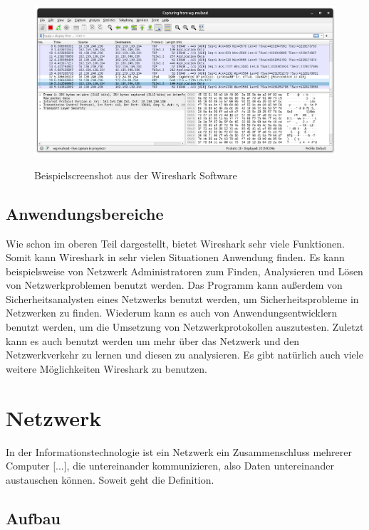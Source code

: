 \documentclass[12pt]{article}
\begin{document}
\begin{figure}[h]
	\begin{center}
		\includegraphics[scale=0.25]{Bilder/Screenshot_1.png}
		\label{fig:figure2}
		\caption{Beispielscreenshot aus der Wireshark Software \cite{screenshots-self}}
	\end{center}
\end{figure}



\subsection{Anwendungsbereiche}
Wie schon im oberen Teil dargestellt, bietet Wireshark sehr viele Funktionen. Somit kann Wireshark in sehr vielen Situationen Anwendung finden. Es kann beispielsweise von Netzwerk Administratoren zum Finden, Analysieren und Lösen von Netzwerkproblemen benutzt werden. Das Programm kann außerdem von Sicherheitsanalysten eines Netzwerks benutzt werden, um Sicherheitsprobleme in Netzwerken zu finden. Wiederum kann es auch von Anwendungsentwicklern benutzt werden, um die Umsetzung von Netzwerkprotokollen auszutesten. Zuletzt kann es auch benutzt werden um mehr über das Netzwerk und den Netzwerkverkehr zu lernen und diesen zu analysieren. Es gibt natürlich auch viele weitere Möglichkeiten Wireshark zu benutzen. \cite{intended-purposes}



\section{Netzwerk}
In der Informationstechnologie ist ein Netzwerk ein Zusammenschluss mehrerer Computer [...], die untereinander kommunizieren, also Daten untereinander austauschen können.\cite{netzwerk-kurthelec} Soweit geht die Definition.  
\subsection{Aufbau}
\end{document}
